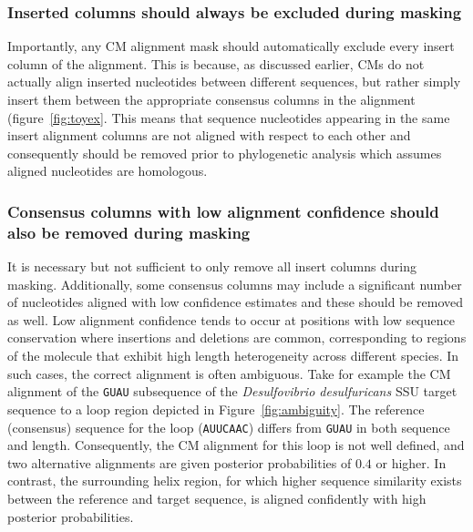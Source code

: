 \subsubsection{Inserted columns should always be excluded during masking}

Importantly, any CM alignment mask should automatically exclude 
every insert column of the alignment. This is because, as discussed
earlier, CMs do not actually align inserted nucleotides between
different sequences, but rather simply insert them between the
appropriate consensus columns in the alignment
(figure~\ref{fig:toyex}. This means that sequence nucleotides
appearing in the same insert alignment columns are not aligned with
respect to each other and consequently should be removed prior to
phylogenetic analysis which assumes aligned nucleotides are
homologous. 

\subsubsection{Consensus columns with low alignment confidence should
  also be removed during masking}

It is necessary but not sufficient to only remove all insert columns
during masking. Additionally, some consensus columns may include
a significant number of nucleotides aligned with low confidence
estimates and these should be removed as well. 
Low alignment confidence tends to occur at positions with low sequence
conservation where insertions and deletions are common, 
corresponding to regions of the molecule that exhibit high length
heterogeneity across different species. 
In such cases, the correct alignment is often ambiguous.
Take for example the CM alignment
of the {\tt GUAU} subsequence of the \emph{Desulfovibrio
desulfuricans} SSU target sequence to a loop region depicted in
Figure~\ref{fig:ambiguity}. The reference (consensus) sequence for the
loop ({\tt AUUCAAC}) differs from {\tt GUAU} in both sequence and
length. Consequently, the CM alignment for this loop is not well
defined, and two alternative alignments are given posterior
probabilities of $0.4$ or higher.  In contrast, the surrounding helix
region, for which higher sequence similarity exists between the
reference and target sequence, is aligned confidently with high
posterior probabilities.


